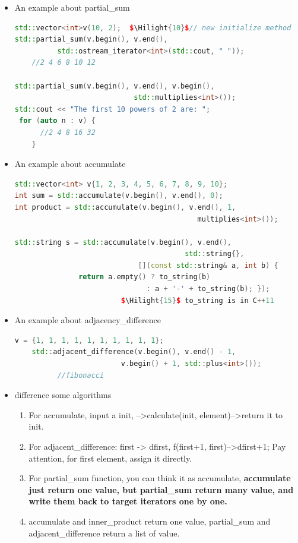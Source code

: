 \documentclass[a4paper,12pt,twoside]{book}
\newcommand{\Hilight}[1]{\makebox[0pt][l]{\color{yellow}\rule[-3pt]{#1em}{11pt}}}
\begin{document}
\begin{itemize}

\item An example about partial\_sum

\begin{lstlisting}[frame=single, language=c++, mathescape=true]
std::vector<int>v(10, 2);  $\Hilight{10}$// new initialize method
std::partial_sum(v.begin(), v.end(),
          std::ostream_iterator<int>(std::cout, " "));
    //2 4 6 8 10 12

std::partial_sum(v.begin(), v.end(), v.begin(),
                            std::multiplies<int>());
std::cout << "The first 10 powers of 2 are: ";
 for (auto n : v) {
      //2 4 8 16 32
    }
\end{lstlisting}
\item An example about accumulate

\begin{lstlisting}[frame=single, language=c++, mathescape=true]
std::vector<int> v{1, 2, 3, 4, 5, 6, 7, 8, 9, 10};
int sum = std::accumulate(v.begin(), v.end(), 0);
int product = std::accumulate(v.begin(), v.end(), 1,
                                           multiplies<int>());

std::string s = std::accumulate(v.begin(), v.end(),
                                        std::string{},
                             [](const std::string& a, int b) {
               return a.empty() ? to_string(b)
                               : a + '-' + to_string(b); });
                         $\Hilight{15}$ to_string is in C++11
\end{lstlisting}

\item An example about adjacency\_difference
\begin{lstlisting}[frame=single, language=c++, mathescape=true]
 v = {1, 1, 1, 1, 1, 1, 1, 1, 1, 1};
    std::adjacent_difference(v.begin(), v.end() - 1,
                         v.begin() + 1, std::plus<int>());
          //fibonacci
\end{lstlisting}

\item difference some algorithms
\begin{enumerate}
\item For accumulate, input a init, -->calculate(init, element)-->return it to init.
\item For adjacent\_difference:   first -> dfirst,  f(first+1, first)-->dfirst+1; Pay attention, for first element, assign it directly.
\item For partial\_sum function, you can think it as accumulate, \textbf{accumulate just return one value, but partial\_sum return many value, and write them back to target iterators one by one.  }
\item accumulate and inner\_product return one value, partial\_sum and adjacent\_difference return a list of value.
\end{enumerate}

\end{itemize}
\end{document}
